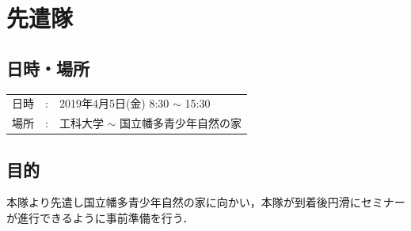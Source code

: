 %
\section{先遣隊}

\subsection{日時・場所}

\begin{tabular}{p{}rp{}}
  日時 & : & 2019年4月5日(金) 8:30 $\sim$ 15:30\\
  場所 & : & 工科大学 $\sim$ 国立幡多青少年自然の家
\end{tabular}

\subsection{目的}
本隊より先遣し国立幡多青少年自然の家に向かい，本隊が到着後円滑にセミナーが進行できるように事前準備を行う．


